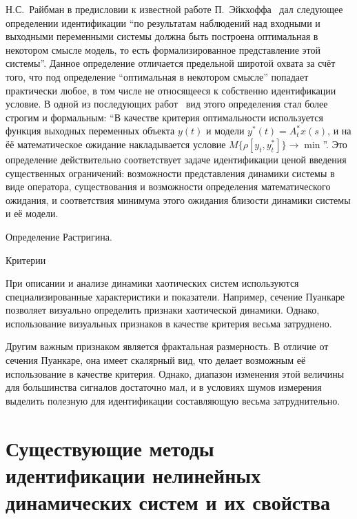 Н.С.~Райбман в предисловии к известной работе П.~Эйкхоффа~\cite{eykhoff_id_base}
дал следующее определении идентификации
``по результатам наблюдений над входными и выходными переменными системы должна быть
построена оптимальная в некотором смысле модель, то есть формализированное представление этой системы''.
Данное определение отличается предельной широтой охвата за счёт того,
что под определение ``оптимальная в некотором смысле'' попадает
практически любое, в том числе не относящееся к собственно идентификации условие.
В одной из последующих работ~\cite{raibman_id_obj_ctl}
вид этого определения стал более строгим и формальным:
``В качестве критерия оптимальности используется функция выходных переменных объекта $y(t)$ и модели
$y^{*}(t) = A_t^{*} x(s) $, и на ёё математическое ожидание накладывается условие
$M \{\rho [ y_t, y_t^{*} ] \} \to {\min}$''.
Это определение действительно соответствует задаче идентификации ценой
введения существенных ограничений: возможности представления динамики системы в виде оператора,
существования и возможности определения математического ожидания,
и соответствия минимума этого ожидания близости динамики системы и её модели.



Определение Растригина.



Критерии

При описании и анализе динамики хаотических
систем используются специализированные характеристики и показатели.
Например, сечение Пуанкаре~\cite{moon_chaotic_vibr,anisch_complex_vibrations_in_simple_systems,atu_st105}
позволяет визуально определить признаки хаотической динамики.
Однако, использование визуальных признаков в качестве критерия
весьма затруднено.

Другим важным признаком является фрактальная размерность. %
В отличие от сечения Пуанкаре, она имеет скалярный вид,
что делает возможным её использование в качестве критерия.
Однако, диапазон изменения этой величины для большинства сигналов достаточно мал,
и в условиях шумов измерения выделить полезную
для идентификации составляющую весьма затруднительно.


\section{Существующие методы идентификации нелинейных динамических систем и их свойства}  %

